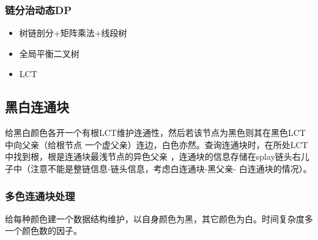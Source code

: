 \subsubsection{链分治动态DP}
\begin{itemize}
    \item 树链剖分+矩阵乘法+线段树
    \item 全局平衡二叉树
    \item LCT
\end{itemize}
\subsection{黑白连通块}
给黑白颜色各开一个有根LCT维护连通性，然后若该节点为黑色则其在黑色LCT中向父亲（给根节点
一个虚父亲）连边，白色亦然。查询连通块时，在所处LCT中找到根，根是连通块最浅节点的异色父亲
，连通块的信息存储在splay链头右儿子中（注意不能是整链信息-链头信息，考虑白连通块-黑父亲-
白连通块的情况）。

\subsubsection{多色连通块处理}
给每种颜色建一个数据结构维护，以自身颜色为黑，其它颜色为白。时间复杂度多一个颜色数的因子。

